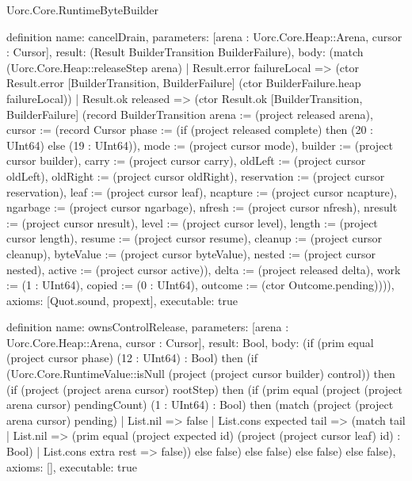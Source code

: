 \begin{lexlean}{Uorc.Core.RuntimeByteBuilder}
\begin{semanticmodule}
definition{
  name: cancelDrain,
  parameters: [arena : Uorc.Core.Heap::Arena, cursor : Cursor],
  result: (Result BuilderTransition BuilderFailure),
  body: (match (Uorc.Core.Heap::releaseStep arena)
    | Result.error failureLocal => (ctor Result.error [BuilderTransition, BuilderFailure] (ctor BuilderFailure.heap failureLocal))
    | Result.ok released => (ctor Result.ok [BuilderTransition, BuilderFailure] (record BuilderTransition {arena := (project released arena), cursor := (record Cursor {phase := (if (project released complete) then (20 : UInt64) else (19 : UInt64)), mode := (project cursor mode), builder := (project cursor builder), carry := (project cursor carry), oldLeft := (project cursor oldLeft), oldRight := (project cursor oldRight), reservation := (project cursor reservation), leaf := (project cursor leaf), ncapture := (project cursor ncapture), ngarbage := (project cursor ngarbage), nfresh := (project cursor nfresh), nresult := (project cursor nresult), level := (project cursor level), length := (project cursor length), resume := (project cursor resume), cleanup := (project cursor cleanup), byteValue := (project cursor byteValue), nested := (project cursor nested), active := (project cursor active)}), delta := (project released delta), work := (1 : UInt64), copied := (0 : UInt64), outcome := (ctor Outcome.pending)}))),
  axioms: [Quot.sound, propext],
  executable: true
}

definition{
  name: ownsControlRelease,
  parameters: [arena : Uorc.Core.Heap::Arena, cursor : Cursor],
  result: Bool,
  body: (if (prim equal (project cursor phase) (12 : UInt64) : Bool) then (if (Uorc.Core.RuntimeValue::isNull (project (project cursor builder) control)) then (if (project (project arena cursor) rootStep) then (if (prim equal (project (project arena cursor) pendingCount) (1 : UInt64) : Bool) then (match (project (project arena cursor) pending)
    | List.nil => false
    | List.cons expected tail => (match tail
      | List.nil => (prim equal (project expected id) (project (project cursor leaf) id) : Bool)
      | List.cons extra rest => false)) else false) else false) else false) else false),
  axioms: [],
  executable: true
}


\end{semanticmodule}
\end{lexlean}
